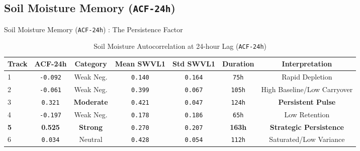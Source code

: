 \documentclass[8pt, aspectratio=169]{beamer}
\begin{document}
\subsection{Soil Moisture Memory (\texttt{ACF-24h})}
\begin{frame}{Soil Moisture Memory (\texttt{ACF-24h}) : The Persistence Factor}
    \begin{table}[H]
        \footnotesize
        \centering
        \caption{Soil Moisture Autocorrelation at 24-hour Lag (\texttt{ACF-24h})}
        \begin{tabular}{lcccccc}
            \toprule
            \textbf{Track} & \textbf{ACF-24h} & \textbf{Category} & \textbf{Mean SWVL1} & \textbf{Std SWVL1} & \textbf{Duration} & \textbf{Interpretation} \\
            \midrule
            1 & \texttt{-0.092} & Weak Neg. & \texttt{0.140} & \texttt{0.164} & \texttt{75h} & Rapid Depletion \\
            2 & \texttt{-0.061} & Weak Neg. & \texttt{0.399} & \texttt{0.067} & \texttt{105h} & High Baseline/Low Carryover \\
            3 & \texttt{0.321}  & \textbf{Moderate} & \texttt{0.421} & \texttt{0.047} & \texttt{124h} & \textbf{Persistent Pulse} \\
            4 & \texttt{-0.197} & Weak Neg. & \texttt{0.178} & \texttt{0.186} & \texttt{65h} & Low Retention \\
            \textbf{5} & \textbf{0.525} & \textbf{Strong} & \texttt{0.270} & \texttt{0.207} & \textbf{163h} & \textbf{Strategic Persistence} \\
            6 & \texttt{0.034}  & Neutral   & \texttt{0.428} & \texttt{0.054} & \texttt{112h} & Saturated/Low Variance \\
            \bottomrule
        \end{tabular}
    \end{table}


\end{frame}
\end{document}
